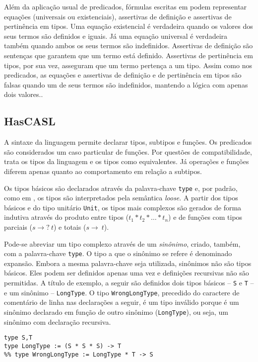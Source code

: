 Além da aplicação usual de predicados, fórmulas escritas em \CASL podem representar equações (universais ou existenciais), assertivas de definição e assertivas de pertinência em tipos.
Uma equação existencial é verdadeira quando os valores dos seus termos são definidos e iguais.
Já uma equação universal é verdadeira também quando ambos os seus termos são indefinidos.
Assertivas de definição são sentenças que garantem que um termo está definido.
Assertivas de pertinência em tipos, por sua vez, asseguram que um termo pertença a um tipo.
Assim como nos predicados, as equações e assertivas de definição e de pertinência em tipos são falsas quando um de seus termos são indefinidos, mantendo a lógica com apenas dois valores..

\subsection{HasCASL}
A sintaxe da linguagem \HasCASL permite declarar tipos, subtipos e funções.
Os predicados são considerados um caso particular de funções.
Por questões de compatibilidade, \HasCASL trata os tipos da linguagem \CASL e os tipos como equivalentes.
Já operações e funções diferem apenas quanto ao comportamento em relação a subtipos.

Os tipos básicos são declarados através da palavra-chave \Verb.type. e, por padrão, como em \CASL, os tipos são interpretados pela semântica \textit{loose}.
A partir dos tipos básicos e do tipo unitário \Verb.Unit., os tipos mais complexos são gerados de forma indutiva através do produto entre tipos ($t_{1} * t_{2} * \ldots * t_{n}$) e de funções com tipos parciais ($s \rightarrow?\ t$) e totais ($s \rightarrow\ t$).

Pode-se abreviar um tipo complexo através de um \textit{sinônimo}, criado, também, com a palavra-chave \Verb.type.. O tipo a que o sinônimo se refere é denominado expansão.
Embora a mesma palavra-chave seja utilizada, sinônimos não são tipos básicos.
Eles podem ser definidos apenas uma vez e definições recursivas não são permitidas.
A título de exemplo, a seguir são definidos dois tipos básicos -- \Verb.S. e \Verb.T. -- e um sinônimo -- \Verb.LongType..
O tipo \Verb.WrongLongType., precedido do caractere de comentário de linha nas declarações a seguir, é um tipo inválido porque é um sinônimo declarado em função de outro sinônimo (\Verb.LongType.), ou seja, um sinônimo com declaração recursiva.

\begin{Verbatim}
type S,T
type LongType := (S * S * S) -> T
%% type WrongLongType := LongType * T -> S
\end{Verbatim}

